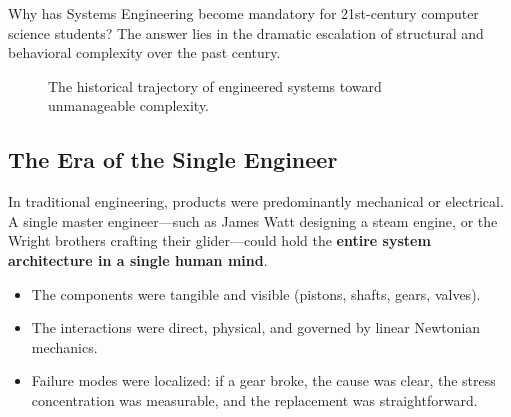 Why has Systems Engineering become mandatory for 21st-century computer science students? The answer lies in the dramatic escalation of structural and behavioral complexity over the past century.

\begin{figure}[htbp]
\centering
{}
\caption{The historical trajectory of engineered systems toward unmanageable complexity.}
\label{fig:complexity_evolution}
\end{figure}

\subsection{The Era of the Single Engineer}
In traditional engineering, products were predominantly mechanical or electrical. A single master engineer—such as James Watt designing a steam engine, or the Wright brothers crafting their glider—could hold the \textbf{entire system architecture in a single human mind}. 
\begin{itemize}[leftmargin=1.5em]
    \item The components were tangible and visible (pistons, shafts, gears, valves).
    \item The interactions were direct, physical, and governed by linear Newtonian mechanics.
    \item Failure modes were localized: if a gear broke, the cause was clear, the stress concentration was measurable, and the replacement was straightforward.
\end{itemize}

